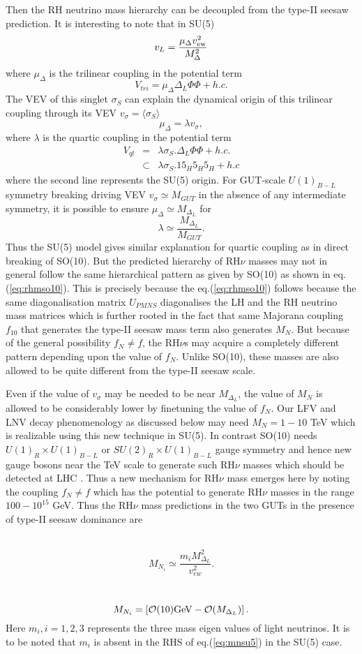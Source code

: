 \documentclass[a4paper,11pt]{article}
\newcommand{\be}{\begin{equation}}
\newcommand{\ee}{\end{equation}}
\newcommand{\bea}{\begin{eqnarray}}
\newcommand{\eea}{\end{eqnarray}}
\begin{document}
Then the RH neutrino mass hierarchy can be decoupled from  the type-II seesaw prediction.
It is interesting to note that in SU(5)
\be
v_L=\frac{\mu_{\Delta}v_{\rm ew}^2}{M_{\Delta}^2}
\ee
where $\mu_{\Delta}$ is the trilinear coupling in the potential term
\be
V_{tri}=\mu_{\Delta}\Delta_L \Phi \Phi +h.c. \label{eq:tlpot}
\ee
 The VEV of this singlet $\sigma_S$ can explain the dynamical origin of this trilinear coupling through its VEV $v_{\sigma}=\langle \sigma_S \rangle$ 
\be
\mu_{\Delta}=\lambda v_{\sigma}, \label{eq:model}
\ee
where $\lambda$ is the quartic coupling in the potential term
\bea
V_{ql}&=&\lambda \sigma_S.\Delta_L\Phi\Phi + h.c.\\
&\subset&\lambda \sigma_S. {15}_H{5}_H{5}_H+h.c \label{eq:qpot}
\eea
where the second line represents the SU(5) origin. For GUT-scale $U(1)_{B-L}$ symmetry breaking driving VEV $v_{\sigma}\simeq M_{GUT}$ in the absence of any intermediate symmetry, it is possible to ensure $\mu_{\Delta}\simeq M_{\Delta_L}$ for 
\be
\lambda \simeq \frac{M_{\Delta_L}}{M_{GUT}}. \label{eq:lamdelgut}
\ee
Thus the SU(5) model gives similar explanation for quartic coupling as
in direct breaking of SO(10).
But the predicted hierarchy of RH$\nu$ masses may not in general
follow the same hierarchical pattern as given by SO(10) as shown in eq.(\ref{eq:rhmso10}).
This is precisely because the eq.(\ref{eq:rhmso10}) follows because the
same diagonalisation matrix $U_{PMNS}$ diagonalises the LH and the RH
neutrino mass matrices which is further rooted in the fact that same
Majorana coupling $f_{10}$ that generates the type-II seesaw mass term
also generates $M_N$. But because of the general possibility $f_N\neq
f$, the RH$\nu$s may acquire a completely different pattern depending
upon the value of $f_N$. Unlike
SO(10), these masses are also allowed to be quite different from the
type-II seesaw scale.

Even if the value of $v_{\sigma}$
may be needed to be near $M_{\Delta_L}$, the value of $M_N$ is allowed
to be considerably lower by finetuning the value of $f_N$.
Our LFV and LNV decay phenomenology as discussed below may need $M_N=1-10$ TeV which is realizable using this new technique in SU(5). In contrast SO(10) needs
$U(1)_R\times U(1)_{B-L}$ or $SU(2)_R\times U(1)_{B-L}$ gauge symmetry
and hence new gauge bosons  near the TeV scale to generate such RH$\nu$
masses which should be detected at LHC \cite{mkp-bs:2015,bpn-mkp:2015}.   
Thus a new mechanism for RH$\nu$ mass emerges here by noting the
coupling $f_N\neq f$ which has the potential to generate RH$\nu$
masses in the range $100-10^{15}$ GeV. Thus the RH$\nu$ mass
predictions in the two GUTs in the presence of type-II seesaw
dominance are
\par{}\\
\be
M_{N_i}\simeq \frac{m_i M^2_{\Delta_L}}{ v_{ew}^2}. \label{eq:mnso10}
\ee
\par{}\\
\be
M_{N_i}=\left[{\cal O}(10){\rm GeV} - {\cal
    O}(M_{\Delta_L})\right].\label{eq:mnsu5}
\ee 
Here $m_i,i=1,2,3$ represents the three mass eigen values of light
neutrinos. It is to be noted that $m_i$ is absent in the RHS of
eq.(\ref{eq:mnsu5}) in the SU(5) case.
\end{document}
